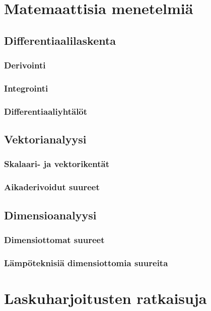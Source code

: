 \documentclass[12pt,a4paper,finnish]{book}
\begin{document}
\part{Matemaattisia menetelmiä} %

\chapter{Differentiaalilaskenta} %

\section{Derivointi}

\section{Integrointi}

\section{Differentiaaliyhtälöt}

\chapter{Vektorianalyysi} %

\section{Skalaari- ja vektorikentät}

\section{Aikaderivoidut suureet}

\chapter{Dimensioanalyysi} %

\section{Dimensiottomat suureet}

\section{Lämpöteknisiä dimensiottomia suureita}

\part{Laskuharjoitusten ratkaisuja} %
\end{document}
